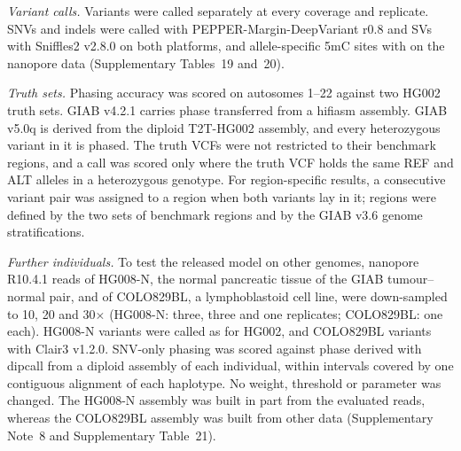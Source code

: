 \emph{Variant calls.}  Variants were called separately at every coverage and replicate.  SNVs and indels were called with PEPPER-Margin-DeepVariant r0.8\cite{shafin2021margin} and SVs with Sniffles2 v2.8.0 on both platforms, and allele-specific 5mC sites with \toolname on the nanopore data (Supplementary Tables~19 and~20).

\emph{Truth sets.}  Phasing accuracy was scored on autosomes 1--22 against two HG002 truth sets.  GIAB v4.2.1\cite{wagner2022giab} carries phase transferred from a hifiasm assembly.  GIAB v5.0q\cite{olson2026giabv5} is derived from the diploid T2T-HG002 assembly\cite{hansen2026q100}, and every heterozygous variant in it is phased.  The truth VCFs were not restricted to their benchmark regions, and a call was scored only where the truth VCF holds the same REF and ALT alleles in a heterozygous genotype.  For region-specific results, a consecutive variant pair was assigned to a region when both variants lay in it; regions were defined by the two sets of benchmark regions and by the GIAB v3.6 genome stratifications\cite{dwarshuis2024stratifications}.

\emph{Further individuals.}  To test the released model on other genomes, nanopore R10.4.1 reads of HG008-N, the normal pancreatic tissue of the GIAB tumour--normal pair\cite{mcdaniel2025hg008}, and of COLO829BL, a lymphoblastoid cell line\cite{sohn2026colo829}, were down-sampled to 10, 20 and 30$\times$ (HG008-N: three, three and one replicates; COLO829BL: one each).  HG008-N variants were called as for HG002, and COLO829BL variants with Clair3 v1.2.0\cite{zheng2022clair3}.  SNV-only phasing was scored against phase derived with dipcall\cite{li2018dipcall} from a diploid assembly of each individual\cite{wagner2026hg008asm,sohn2026colo829}, within intervals covered by one contiguous alignment of each haplotype.  No weight, threshold or parameter was changed.  The HG008-N assembly was built in part from the evaluated reads, whereas the COLO829BL assembly was built from other data (Supplementary Note~8 and Supplementary Table~21).

